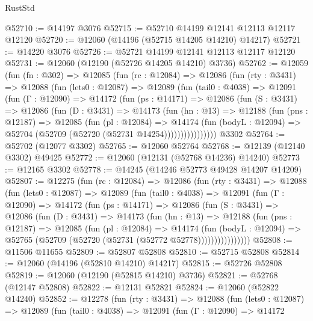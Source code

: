 \begin{lexlean}{RustStd}
\begin{coremodule}
@52710 := @14197 @3076
@52715 := @52710 @14199 @12141 @12113 @12117 @12120
@52720 := @12060 (@14196 (@52715 @14205 @14210) @14217)
@52721 := @14220 @3076
@52726 := @52721 @14199 @12141 @12113 @12117 @12120
@52731 := @12060 (@12190 (@52726 @14205 @14210) @3736)
@52762 := @12059
    (fun (fn : @302) =>
    @12085
      (fun (rc : @12084) =>
      @12086
        (fun (rty : @3431) =>
        @12088
          (fun (lets0 : @12087) =>
          @12089
            (fun (tail0 : @4038) =>
            @12091
              (fun (Γ : @12090) =>
              @14172
                (fun (ps : @14171) =>
                @12086
                  (fun (S : @3431) =>
                  @12086
                    (fun (D : @3431) =>
                    @14173
                      (fun (hn : @13) =>
                      @12188
                        (fun (pns : @12187) =>
                        @12085
                          (fun (pl : @12084) =>
                          @14174
                            (fun (bodyL : @12094) =>
                            @52704 (@52709 (@52720 (@52731 @14254))))))))))))))))
    @3302
@52764 := @52702 (@12077 @3302)
@52765 := @12060 @52764
@52768 := @12139 (@12140 @3302) @49425
@52772 := @12060 (@12131 (@52768 @14236) @14240)
@52773 := @12165 @3302
@52778 := @14245 (@14246 @52773 @49428 @14207 @14209)
@52807 := @12275
    (fun (rc : @12084) =>
    @12086
      (fun (rty : @3431) =>
      @12088
        (fun (lets0 : @12087) =>
        @12089
          (fun (tail0 : @4038) =>
          @12091
            (fun (Γ : @12090) =>
            @14172
              (fun (ps : @14171) =>
              @12086
                (fun (S : @3431) =>
                @12086
                  (fun (D : @3431) =>
                  @14173
                    (fun (hn : @13) =>
                    @12188
                      (fun (pns : @12187) =>
                      @12085
                        (fun (pl : @12084) =>
                        @14174
                          (fun (bodyL : @12094) =>
                          @52765 (@52709 (@52720 (@52731 (@52772 @52778))))))))))))))))
@52808 := @11506 @11655
@52809 := @52807 @52808
@52810 := @52715 @52808
@52814 := @12060 (@14196 (@52810 @14210) @14217)
@52815 := @52726 @52808
@52819 := @12060 (@12190 (@52815 @14210) @3736)
@52821 := @52768 (@12147 @52808)
@52822 := @12131 @52821
@52824 := @12060 (@52822 @14240)
@52852 := @12278
    (fun (rty : @3431) =>
    @12088
      (fun (lets0 : @12087) =>
      @12089
        (fun (tail0 : @4038) =>
        @12091
          (fun (Γ : @12090) =>
          @14172

\end{coremodule}
\end{lexlean}
